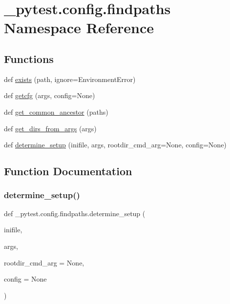 \hypertarget{namespace__pytest_1_1config_1_1findpaths}{}\section{\+\_\+pytest.\+config.\+findpaths Namespace Reference}
\label{namespace__pytest_1_1config_1_1findpaths}
\subsection*{Functions}
\begin{DoxyCompactItemize}
\item 
def \hyperlink{namespace__pytest_1_1config_1_1findpaths_a9fb2f8814288461c0e17f68f914b96d6}{exists} (path, ignore=Environment\+Error)
\item 
def \hyperlink{namespace__pytest_1_1config_1_1findpaths_a87906129c3e7a99643752cebd68cf614}{getcfg} (args, config=None)
\item 
def \hyperlink{namespace__pytest_1_1config_1_1findpaths_a62b3cd825714a887173480a03365b32d}{get\+\_\+common\+\_\+ancestor} (paths)
\item 
def \hyperlink{namespace__pytest_1_1config_1_1findpaths_ab5d0fc2e502534d91615d07b995a1959}{get\+\_\+dirs\+\_\+from\+\_\+args} (args)
\item 
def \hyperlink{namespace__pytest_1_1config_1_1findpaths_a0ec73cdccb3210e021740a08d54443c7}{determine\+\_\+setup} (inifile, args, rootdir\+\_\+cmd\+\_\+arg=None, config=None)
\end{DoxyCompactItemize}


\subsection{Function Documentation}
\mbox{\label{namespace__pytest_1_1config_1_1findpaths_a0ec73cdccb3210e021740a08d54443c7}} 
\subsubsection{\texorpdfstring{determine\+\_\+setup()}{determine\_setup()}}
{\footnotesize\ttfamily def \+\_\+pytest.\+config.\+findpaths.\+determine\+\_\+setup (\begin{DoxyParamCaption}\item[{}]{inifile,  }\item[{}]{args,  }\item[{}]{rootdir\+\_\+cmd\+\_\+arg = {\ttfamily None},  }\item[{}]{config = {\ttfamily None} }\end{DoxyParamCaption})}

